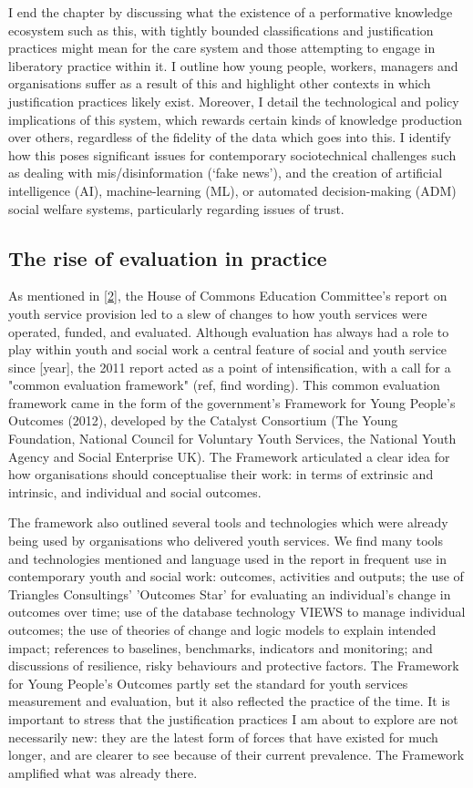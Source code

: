 I end the chapter by discussing what the existence of a performative knowledge ecosystem such as this, with tightly bounded classifications and justification practices might mean for the care system and those attempting to engage in liberatory practice within it. I outline how young people, workers, managers and organisations suffer as a result of this and highlight other contexts in which justification practices likely exist. Moreover, I detail the technological and policy implications of this system, which rewards certain kinds of knowledge production over others, regardless of the fidelity of the data which goes into this. I identify how this poses significant issues for contemporary sociotechnical challenges such as dealing with mis/disinformation (‘fake news’), and the creation of artificial intelligence (AI), machine-learning (ML), or automated decision-making  (ADM) social welfare systems, particularly regarding issues of trust. 

\subsection{The rise of evaluation in practice}
As mentioned in \ref{2}, the House of Commons Education Committee's report on youth service provision led to a slew of changes to how youth services were operated, funded, and evaluated. Although evaluation has always had a role to play within youth and social work a central feature of social and youth service since [year], the 2011 report acted as a point of intensification, with a call for a "common evaluation framework" (ref, find wording). This common evaluation framework came in the form of the government's Framework for Young People's Outcomes (2012), developed by the Catalyst Consortium (The Young Foundation, National Council for Voluntary Youth Services, the National Youth Agency and Social Enterprise UK). The Framework articulated a clear idea for how organisations should conceptualise their work: in terms of extrinsic and intrinsic, and individual and social outcomes.

The framework also outlined several tools and technologies which were already being used by organisations who delivered youth services. We find many tools and technologies mentioned and language used in the report in frequent use in contemporary youth and social work: outcomes, activities and outputs; the use of Triangles Consultings' 'Outcomes Star' for evaluating an individual's change in outcomes over time; use of the database technology VIEWS to manage individual outcomes; the use of theories of change and logic models to explain intended impact; references to baselines, benchmarks, indicators and monitoring; and discussions of resilience, risky behaviours and protective factors. The Framework for Young People's Outcomes partly set the standard for youth services measurement and evaluation, but it also reflected the practice of the time. It is important to stress that the justification practices I am about to explore are not necessarily new: they are the latest form of forces that have existed for much longer, and are clearer to see because of their current prevalence. The Framework amplified what was already there. 


